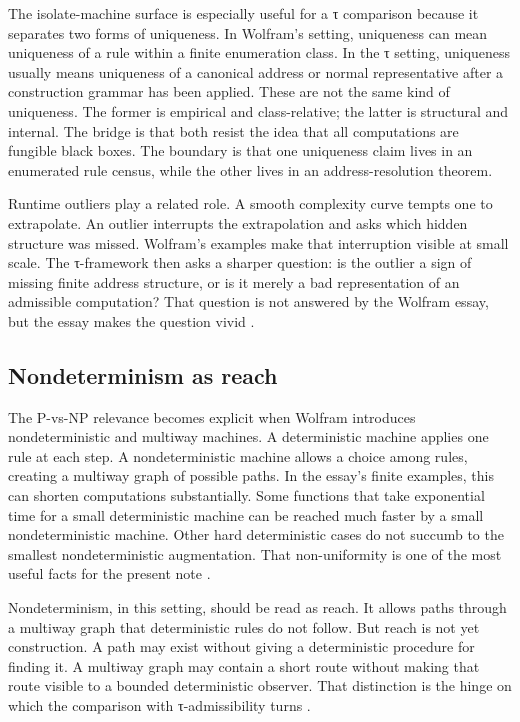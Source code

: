 \documentclass{pantarhei-researchnote}
\begin{document}
The isolate-machine surface is especially useful for a τ comparison
because it separates two forms of uniqueness. In Wolfram's setting,
uniqueness can mean uniqueness of a rule within a finite enumeration
class. In the τ setting, uniqueness usually means uniqueness of a
canonical address or normal representative after a construction grammar
has been applied. These are not the same kind of uniqueness. The former
is empirical and class-relative; the latter is structural and internal.
The bridge is that both resist the idea that all computations are
fungible black boxes. The boundary is that one uniqueness claim lives in
an enumerated rule census, while the other lives in an address-resolution
theorem.

Runtime outliers play a related role. A smooth complexity curve tempts
one to extrapolate. An outlier interrupts the extrapolation and asks
which hidden structure was missed. Wolfram's examples make that
interruption visible at small scale. The τ-framework then asks a sharper
question: is the outlier a sign of missing finite address structure, or
is it merely a bad representation of an admissible computation? That
question is not answered by the Wolfram essay, but the essay makes the
question vivid \cite{Wolfram2026RuliologicalPNP}.

\subsection{Nondeterminism as reach}

The P-vs-NP relevance becomes explicit when Wolfram introduces
nondeterministic and multiway machines. A deterministic machine applies one
rule at each step. A nondeterministic machine allows a choice among rules,
creating a multiway graph of possible paths. In the essay's finite
examples, this can shorten computations substantially. Some functions that
take exponential time for a small deterministic machine can be reached much
faster by a small nondeterministic machine. Other hard deterministic cases
do not succumb to the smallest nondeterministic augmentation. That
non-uniformity is one of the most useful facts for the present note
\cite{Wolfram2026RuliologicalPNP}.

Nondeterminism, in this setting, should be read as reach. It allows paths
through a multiway graph that deterministic rules do not follow. But reach
is not yet construction. A path may exist without giving a deterministic
procedure for finding it. A multiway graph may contain a short route
without making that route visible to a bounded deterministic observer. That
distinction is the hinge on which the comparison with τ-admissibility
turns \cite{Wolfram2026RuliologicalPNP}.
\end{document}
